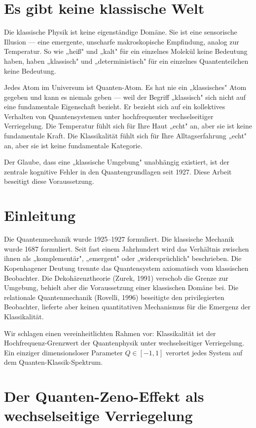 \documentclass[12pt]{article}
\begin{document}
\section{Es gibt keine klassische Welt}

Die klassische Physik ist keine eigenständige Domäne. Sie ist eine sensorische Illusion — eine emergente, unscharfe makroskopische Empfindung, analog zur Temperatur. So wie „heiß" und „kalt" für ein einzelnes Molekül keine Bedeutung haben, haben „klassisch" und „deterministisch" für ein einzelnes Quantenteilchen keine Bedeutung.

Jedes Atom im Universum ist Quanten-Atom. Es hat nie ein „klassisches" Atom gegeben und kann es niemals geben — weil der Begriff „klassisch" sich nicht auf eine fundamentale Eigenschaft bezieht. Er bezieht sich auf ein kollektives Verhalten von Quantensystemen unter hochfrequenter wechselseitiger Verriegelung. Die Temperatur fühlt sich für Ihre Haut „echt" an, aber sie ist keine fundamentale Kraft. Die Klassikalität fühlt sich für Ihre Alltagserfahrung „echt" an, aber sie ist keine fundamentale Kategorie.

Der Glaube, dass eine „klassische Umgebung" unabhängig existiert, ist der zentrale kognitive Fehler in den Quantengrundlagen seit 1927. Diese Arbeit beseitigt diese Voraussetzung.

\section{Einleitung}

Die Quantenmechanik wurde 1925--1927 formuliert. Die klassische Mechanik wurde 1687 formuliert. Seit fast einem Jahrhundert wird das Verhältnis zwischen ihnen als „komplementär", „emergent" oder „widersprüchlich" beschrieben. Die Kopenhagener Deutung trennte das Quantensystem axiomatisch vom klassischen Beobachter. Die Dekohärenztheorie (Zurek, 1991) verschob die Grenze zur Umgebung, behielt aber die Voraussetzung einer klassischen Domäne bei. Die relationale Quantenmechanik (Rovelli, 1996) beseitigte den privilegierten Beobachter, lieferte aber keinen quantitativen Mechanismus für die Emergenz der Klassikalität.

Wir schlagen einen vereinheitlichten Rahmen vor: Klassikalität ist der Hochfrequenz-Grenzwert der Quantenphysik unter wechselseitiger Verriegelung. Ein einziger dimensionsloser Parameter $Q \in [-1, 1]$ verortet jedes System auf dem Quanten-Klassik-Spektrum.

\section{Der Quanten-Zeno-Effekt als wechselseitige Verriegelung}
\end{document}
